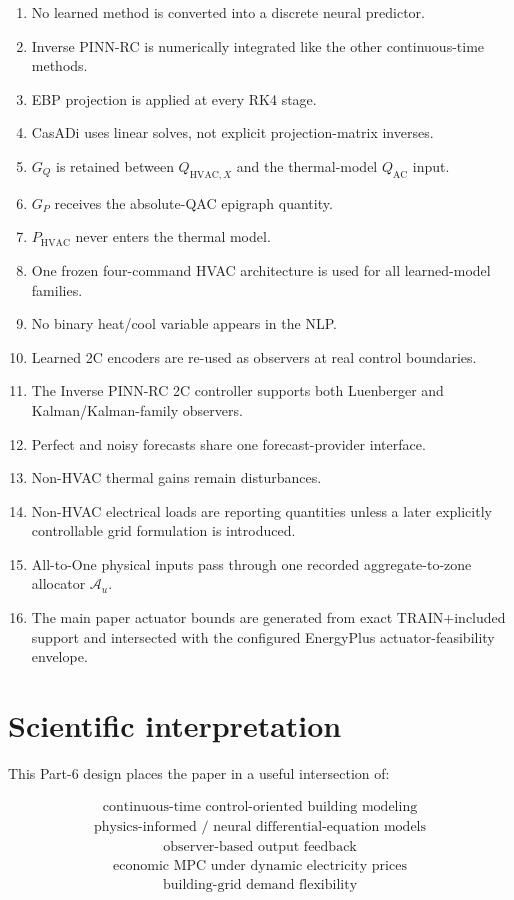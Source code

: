 \documentclass[11pt]{article}
\newcommand{\QAC}{Q_{\mathrm{AC}}}
\newcommand{\QHX}{Q_{\mathrm{HVAC},X}}
\newcommand{\PHVAC}{P_{\mathrm{HVAC}}}
\begin{document}
\begin{enumerate}[leftmargin=2em]
\item No learned method is converted into a discrete neural predictor.
\item Inverse PINN-RC is numerically integrated like the other continuous-time methods.
\item EBP projection is applied at every RK4 stage.
\item CasADi uses linear solves, not explicit projection-matrix inverses.
\item \(G_Q\) is retained between \(\QHX\) and the thermal-model \(\QAC\) input.
\item \(G_P\) receives the absolute-QAC epigraph quantity.
\item \(\PHVAC\) never enters the thermal model.
\item One frozen four-command HVAC architecture is used for all learned-model families.
\item No binary heat/cool variable appears in the NLP.
\item Learned 2C encoders are re-used as observers at real control boundaries.
\item The Inverse PINN-RC 2C controller supports both Luenberger and Kalman/Kalman-family observers.
\item Perfect and noisy forecasts share one forecast-provider interface.
\item Non-HVAC thermal gains remain disturbances.
\item Non-HVAC electrical loads are reporting quantities unless a later explicitly controllable
grid formulation is introduced.
\item All-to-One physical inputs pass through one recorded aggregate-to-zone allocator \(\mathcal A_u\).
\item The main paper actuator bounds are generated from exact TRAIN+included support and intersected
with the configured EnergyPlus actuator-feasibility envelope.
\end{enumerate}

\section{Scientific interpretation}

This Part-6 design places the paper in a useful intersection of:

\begin{align}
\boxed{\text{continuous-time control-oriented building modeling}}
\end{align}
\begin{align}
\boxed{\text{physics-informed / neural differential-equation models}}
\end{align}
\begin{align}
\boxed{\text{observer-based output feedback}}
\end{align}
\begin{align}
\boxed{\text{economic MPC under dynamic electricity prices}}
\end{align}
\begin{align}
\boxed{\text{building-grid demand flexibility}}
\end{align}
\end{document}
